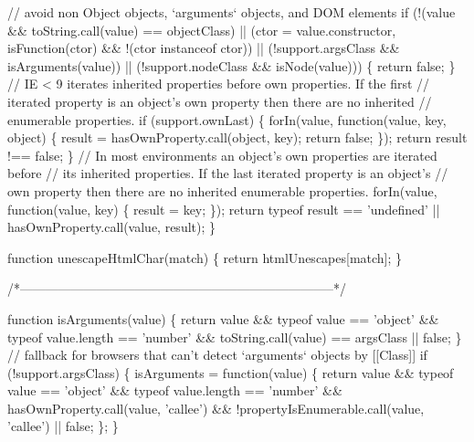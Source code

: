 \begin{DoxyCodeInclude}
      \textcolor{comment}{// avoid non Object objects, `arguments` objects, and DOM elements}
      \textcolor{keywordflow}{if} (!(value && toString.call(value) == objectClass) ||
          (ctor = value.constructor, isFunction(ctor) && !(ctor instanceof ctor)) ||
          (!support.argsClass && isArguments(value)) ||
          (!support.nodeClass && isNode(value))) \{
        \textcolor{keywordflow}{return} \textcolor{keyword}{false};
      \}
      \textcolor{comment}{// IE < 9 iterates inherited properties before own properties. If the first}
      \textcolor{comment}{// iterated property is an object's own property then there are no inherited}
      \textcolor{comment}{// enumerable properties.}
      \textcolor{keywordflow}{if} (support.ownLast) \{
        forIn(value, \textcolor{keyword}{function}(value, key, \textcolor{keywordtype}{object}) \{
          result = hasOwnProperty.call(\textcolor{keywordtype}{object}, key);
          \textcolor{keywordflow}{return} \textcolor{keyword}{false};
        \});
        \textcolor{keywordflow}{return} result !== \textcolor{keyword}{false};
      \}
      \textcolor{comment}{// In most environments an object's own properties are iterated before}
      \textcolor{comment}{// its inherited properties. If the last iterated property is an object's}
      \textcolor{comment}{// own property then there are no inherited enumerable properties.}
      forIn(value, \textcolor{keyword}{function}(value, key) \{
        result = key;
      \});
      \textcolor{keywordflow}{return} typeof result == \textcolor{stringliteral}{'undefined'} || hasOwnProperty.call(value, result);
    \}

    \textcolor{keyword}{function} unescapeHtmlChar(match) \{
      \textcolor{keywordflow}{return} htmlUnescapes[match];
    \}

    \textcolor{comment}{/*--------------------------------------------------------------------------*/}

    \textcolor{keyword}{function} isArguments(value) \{
      \textcolor{keywordflow}{return} value && typeof value == \textcolor{stringliteral}{'object'} && typeof value.length == \textcolor{stringliteral}{'number'} &&
        toString.call(value) == argsClass || \textcolor{keyword}{false};
    \}
    \textcolor{comment}{// fallback for browsers that can't detect `arguments` objects by [[Class]]}
    \textcolor{keywordflow}{if} (!support.argsClass) \{
      isArguments = \textcolor{keyword}{function}(value) \{
        \textcolor{keywordflow}{return} value && typeof value == \textcolor{stringliteral}{'object'} && typeof value.length == \textcolor{stringliteral}{'number'} &&
          hasOwnProperty.call(value, \textcolor{stringliteral}{'callee'}) && !propertyIsEnumerable.call(value, \textcolor{stringliteral}{'callee'}) || \textcolor{keyword}{false};
      \};
    \}


\end{DoxyCodeInclude}
